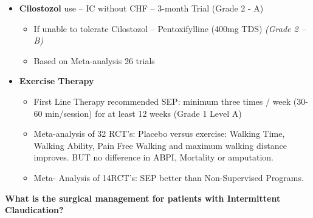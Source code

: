 \documentclass[
]{book}
\begin{document}
\begin{itemize}
\item
  \textbf{Cilostozol} use -- IC without CHF -- 3-month Trial (Grade 2 - A)

  \begin{itemize}
  \item
    If unable to tolerate Cilostozol -- Pentoxifylline (400mg TDS)
    \emph{(Grade 2 -- B)}
  \item
    Based on Meta-analysis 26 trials
    \citep{stevensSystematicReviewEfficacy2012}
  \end{itemize}
\item
  \textbf{Exercise Therapy}

  \begin{itemize}
  \item
    First Line Therapy recommended SEP: minimum three times / week
    (30-60 min/session) for at least 12 weeks (Grade 1 Level A)
  \item
    Meta-analysis of 32 RCT's: Placebo versus exercise: Walking
    Time, Walking Ability, Pain Free Walking and maximum walking
    distance improves. BUT no difference in ABPI, Mortality or
    amputation. \citep{laneExerciseIntermittentClaudication2017}
  \item
    Meta- Analysis of 14RCT's: SEP better than Non-Supervised
    Programs. \citep{hagemanSupervisedExerciseTherapy2018}
  \end{itemize}
\end{itemize}

\textbf{What is the surgical management for patients with Intermittent Claudication?}
\end{document}
